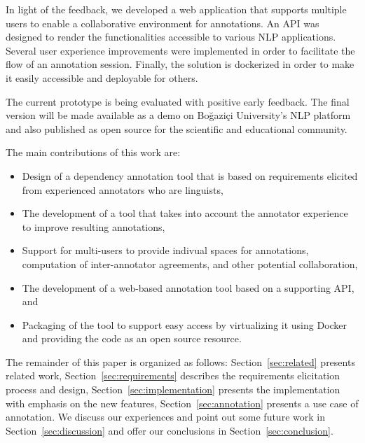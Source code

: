 In light of the feedback, we developed a web application that supports multiple users to enable a collaborative environment for annotations.
An API was designed to render the functionalities accessible to various NLP applications.
Several user experience improvements were implemented in order to facilitate the flow of an annotation session.
Finally, the solution is dockerized in order to make it easily accessible and deployable for others.

The current prototype is being evaluated with positive early feedback.
The final version will be made available as a demo on Boğaziçi University's NLP platform~\cite{DIP} and also published as open source for the scientific and educational community.

The main contributions of this work are:
\begin{itemize}
        \item Design of a dependency annotation tool that is based on requirements elicited from experienced annotators who are linguists,
        \item The development of a tool that takes into account the annotator experience to improve resulting annotations,
        \item Support for multi-users to provide indivual spaces for annotations, computation of inter-annotator agreements, and other potential collaboration,
        \item The development of a web-based annotation tool based on a supporting API, and
        \item Packaging of the tool to support easy access by virtualizing it using Docker and providing the code as an open source resource.
\end{itemize}
The remainder of this paper is organized as follows:
Section~\ref{sec:related} presents related work,
Section~\ref{sec:requirements} describes the requirements elicitation process and design,
Section~\ref{sec:implementation} presents the implementation with emphasis on the new features,
Section~\ref{sec:annotation} presents a use case of annotation.
We discuss our experiences and point out some future work in Section~\ref{sec:discussion} and offer our conclusions  in Section~\ref{sec:conclusion}.
